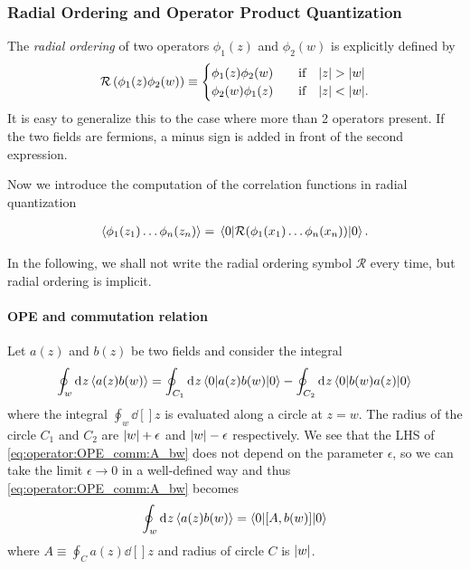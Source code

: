 \documentclass[10pt]{article}
\newenvironment{boxmath}[1]{\begin{tcolorbox}[enhanced,attach boxed title to top center={yshift=-\tcboxedtitleheight/2},boxrule=1pt,title={\centering #1},colframe=NavyBlue!70!black,colback=NavyBlue!10,colbacktitle=NavyBlue!10,fonttitle=\scshape,coltitle=Black]}{\end{tcolorbox}}
\begin{document}
\subsubsection{Radial Ordering and Operator Product Quantization}
\begin{definition}
    The \textit{radial ordering} of two operators $\phi_1(z)$ and $\phi_2(w)$ is explicitly defined by\snm
    \begin{equation}
        \mathcal{R}\left(\phi_1(z)\phi_2(w)\right)\equiv\begin{cases}
            \phi_1(z)\phi_2(w) & \qif\abs{z}>\abs{w}  \\
            \phi_2(w)\phi_1(z) & \qif\abs{z}<\abs{w}.
        \end{cases}
    \end{equation}
    It is easy to generalize this to the case where more than 2 operators present.
    If the two fields are fermions, a minus sign is added in front of the second expression.
\end{definition}
Now we introduce the computation of the correlation functions in radial quantization
\begin{boxmath}{Radial Quantization}
    \begin{align}
        \expval{\phi_1(z_1)\dots\phi_n(z_n)}=\ev*{\mathcal{R}(\phi_1(x_1)\dots\phi_n(x_n))}{0}.
    \end{align}
\end{boxmath}
In the following, we shall not write the radial ordering symbol $\mathcal{R}$ every time, but radial ordering is implicit.
\paragraph{OPE and commutation relation}
Let $a(z)$ and $b(z)$ be two fields and consider the integral
\begin{equation}
    \oint_w\dd[]{z}\expval{a(z)b(w)}= \oint_{C_1}\dd[]{z}\ev**{a(z)b(w)}{0}-\oint_{C_2}\dd[]{z}\ev**{b(w)a(z)}{0}\label{eq:operator:OPE_comm:A_bw}
\end{equation}
where the integral $\oint_w\dd[]{z}$ is evaluated along a circle at $z=w$.
The radius of the circle $C_1$ and $C_2$ are $\abs{w}+\epsilon$ and $\abs{w}-\epsilon$ respectively.
We see that the LHS of \cref{eq:operator:OPE_comm:A_bw} does not depend on the parameter $\epsilon$, so we can take the limit $\epsilon\to0$ in a well-defined way and thus \cref{eq:operator:OPE_comm:A_bw} becomes
\begin{equation}
    \oint_w\dd[]{z}\expval{a(z)b(w)}=  \ev**{\comm{A}{b(w)}}{0}\label{eq:operator:OPE_comm:def}
\end{equation}
where $A\equiv\oint_C a(z)\dd[]{z}$ and radius of circle $C$ is $\abs{w}$.
\end{document}
